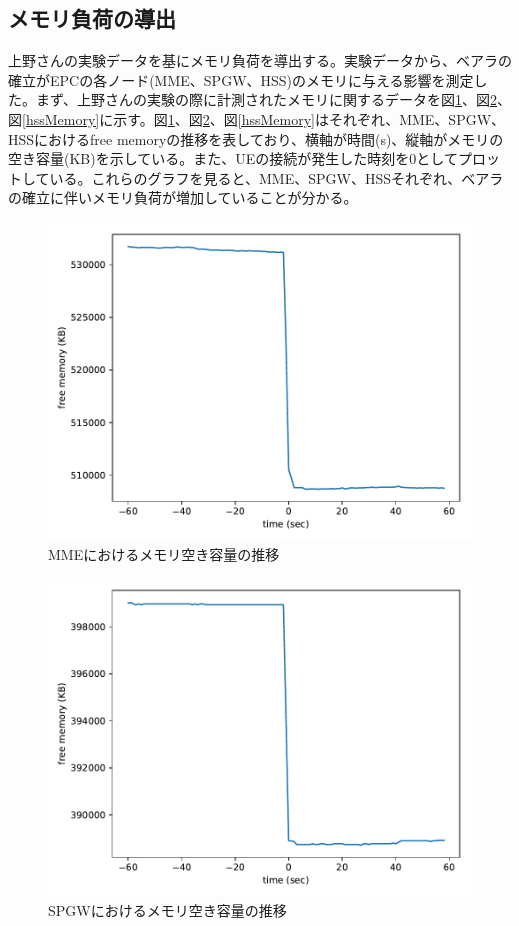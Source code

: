 \documentclass[a4j]{ujarticle}
\begin{document}
\subsection{メモリ負荷の導出}
上野さんの実験データを基にメモリ負荷を導出する。実験データから、ベアラの確立がEPCの各ノード(MME、SPGW、HSS)のメモリに与える影響を測定した。まず、上野さんの実験の際に計測されたメモリに関するデータを図\ref{mmeMemory}、図\ref{spgwMemory}、図\ref{hssMemory}に示す。図\ref{mmeMemory}、図\ref{spgwMemory}、図\ref{hssMemory}はそれぞれ、MME、SPGW、HSSにおけるfree memoryの推移を表しており、横軸が時間(s)、縦軸がメモリの空き容量(KB)を示している。また、UEの接続が発生した時刻を0としてプロットしている。これらのグラフを見ると、MME、SPGW、HSSそれぞれ、ベアラの確立に伴いメモリ負荷が増加していることが分かる。

\begin{figure}[htbp]
	\centering
	\includegraphics[width=0.7\hsize]{mmeMemory.pdf}
  \caption{MMEにおけるメモリ空き容量の推移}
	\label{mmeMemory}
\end{figure}

\begin{figure}[htbp]
	\centering
	\includegraphics[width=0.7\hsize]{spgwMemory.pdf}
  \caption{SPGWにおけるメモリ空き容量の推移}
	\label{spgwMemory}
\end{figure}
\end{document}
